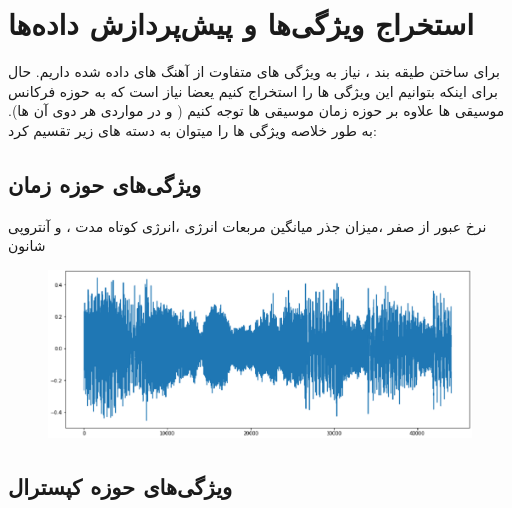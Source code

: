 \documentclass[10pt,onecolumn,a4paper]{article}
\begin{document}
\pagebreak
\section{استخراج ویژگی‌ها و پیش‌پردازش داده‌ها}


برای ساختن طیقه بند ، نیاز به ویژگی های متفاوت از آهنگ های داده شده داریم. حال برای اینکه بتوانیم این ویژگی ها را استخراج کنیم یعضا نیاز است که به حوزه فرکانس موسیقی ها علاوه بر حوزه زمان موسیقی ها توجه کنیم ( و در مواردی هر دوی آن ها). به طور خلاصه ویژگی ها را میتوان به دسته های زیر تقسیم کرد: \\
\subsection{ویژگی‌های حوزه زمان}
نرخ عبور از صفر  ،میزان جذر میانگین مربعات انرژی ،انرژی  کوتاه مدت  ،  و آنتروپی شانون \\


\begin{figure}[h!]
        \centering
        \includegraphics[scale=0.5]{1.png}
        \caption{  }  
    \end{figure}


\subsection{ویژگی‌های حوزه کپسترال}
\end{document}
